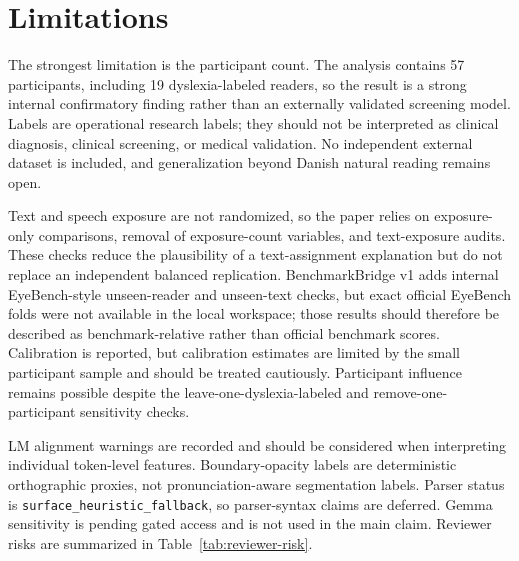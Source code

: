 \section{Limitations}
The strongest limitation is the participant count. The analysis contains 57
participants, including 19 dyslexia-labeled readers, so the result is a strong internal
confirmatory finding rather than an externally validated screening model. Labels are
operational research labels; they should not be interpreted as clinical diagnosis,
clinical screening, or medical validation. No independent external dataset is included,
and generalization beyond Danish natural reading remains open.

Text and speech exposure are not randomized, so the paper relies on exposure-only
comparisons, removal of exposure-count variables, and text-exposure audits. These
checks reduce the plausibility of a text-assignment explanation but do not replace an
independent balanced replication. BenchmarkBridge v1 adds internal EyeBench-style
unseen-reader and unseen-text checks, but exact official EyeBench folds were not
available in the local workspace; those results should therefore be described as
benchmark-relative rather than official benchmark scores. Calibration is reported, but
calibration estimates are limited by the small participant sample and should be treated
cautiously. Participant influence remains possible despite the leave-one-dyslexia-labeled
and remove-one-participant sensitivity checks.

LM alignment warnings are recorded and should be considered when interpreting
individual token-level features. Boundary-opacity labels are deterministic
orthographic proxies, not pronunciation-aware segmentation labels. Parser status is
\texttt{surface\_heuristic\_fallback}, so parser-syntax claims are deferred. Gemma
sensitivity is pending gated access and is not used in the main claim. Reviewer risks
are summarized in Table~\ref{tab:reviewer-risk}.



